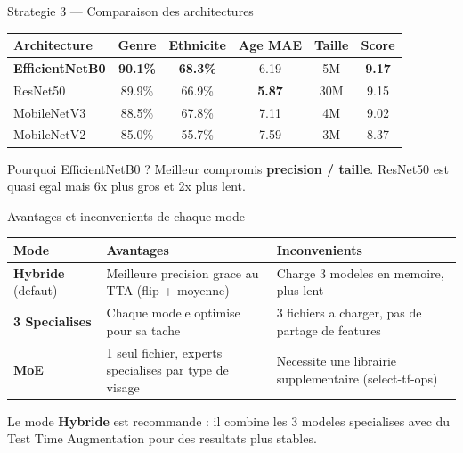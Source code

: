 \documentclass[aspectratio=169, 12pt]{beamer}
\begin{document}
\begin{frame}{Strategie 3 --- Comparaison des architectures}

\begin{center}
{\small
\begin{tabular}{lccccc}
\toprule
\textbf{Architecture} & \textbf{Genre} & \textbf{Ethnicite} & \textbf{Age MAE} & \textbf{Taille} & \textbf{Score} \\
\midrule
\textbf{EfficientNetB0} & \textbf{90.1\%} & \textbf{68.3\%} & 6.19 & 5M & \textbf{9.17} \\
ResNet50 & 89.9\% & 66.9\% & \textbf{5.87} & 30M & 9.15 \\
MobileNetV3 & 88.5\% & 67.8\% & 7.11 & 4M & 9.02 \\
MobileNetV2 & 85.0\% & 55.7\% & 7.59 & 3M & 8.37 \\
\bottomrule
\end{tabular}
}
\end{center}

\vspace{0.3cm}

\begin{exampleblock}{Pourquoi EfficientNetB0 ?}
{\small Meilleur compromis \textbf{precision / taille}. ResNet50 est quasi egal mais 6x plus gros et 2x plus lent.}
\end{exampleblock}
\end{frame}

\begin{frame}{Avantages et inconvenients de chaque mode}

{\small
\begin{center}
\begin{tabular}{p{2.5cm}p{4.5cm}p{4.5cm}}
\toprule
\textbf{Mode} & \textbf{Avantages} & \textbf{Inconvenients} \\
\midrule
\textbf{Hybride} (defaut) & Meilleure precision grace au TTA (flip + moyenne) & Charge 3 modeles en memoire, plus lent \\
\midrule
\textbf{3 Specialises} & Chaque modele optimise pour sa tache & 3 fichiers a charger, pas de partage de features \\
\midrule
\textbf{MoE} & 1 seul fichier, experts specialises par type de visage & Necessite une librairie supplementaire (select-tf-ops) \\
\bottomrule
\end{tabular}
\end{center}
}

\vspace{0.2cm}
\centering
{\small\color{steel} Le mode \textbf{Hybride} est recommande : il combine les 3 modeles specialises avec du Test Time Augmentation pour des resultats plus stables.}
\end{frame}
\end{document}
